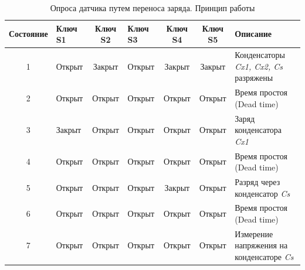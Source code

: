 \begin{table}[H]
\caption{Опроса датчика путем переноса заряда. Принцип работы}\label{PerenosZaryada}
\begin{center}
\begin{tabular}{|c|>{\centering}m{2cm}|c|>{\centering}m{2cm}|c|c|>{\centering\arraybackslash}m{3cm}|}
\hline
Состояние & Ключ S1 & Ключ S2 & Ключ S3 & Ключ S4 & Ключ S5 & Описание\\
\hline
1 & Открыт & Закрыт & Открыт & Закрыт & Закрыт & Конденсаторы \textit{Cx1, Cx2, Cs} разряжены\\
\hline
2 & Открыт & Открыт & Открыт & Открыт & Открыт & Время простоя (Dead time)\\
\hline
3 & Закрыт & Открыт & Открыт & Открыт & Открыт & Заряд конденсатора \textit{Cx1}\\
\hline

4 & Открыт & Открыт & Открыт & Открыт & Открыт & Время простоя (Dead time)\\
\hline
5 & Открыт & Открыт & Открыт & Закрыт & Открыт & Разряд через конденсатор \textit{Cs}\\
\hline
6 & Открыт & Открыт & Открыт & Открыт & Открыт & Время простоя (Dead time)\\
\hline
7 &Открыт & Открыт & Открыт & Открыт & Открыт & Измерение напряжения на конденсаторе \textit{Cs}\\
\hline
\end{tabular}
\end{center}
\end{table}








